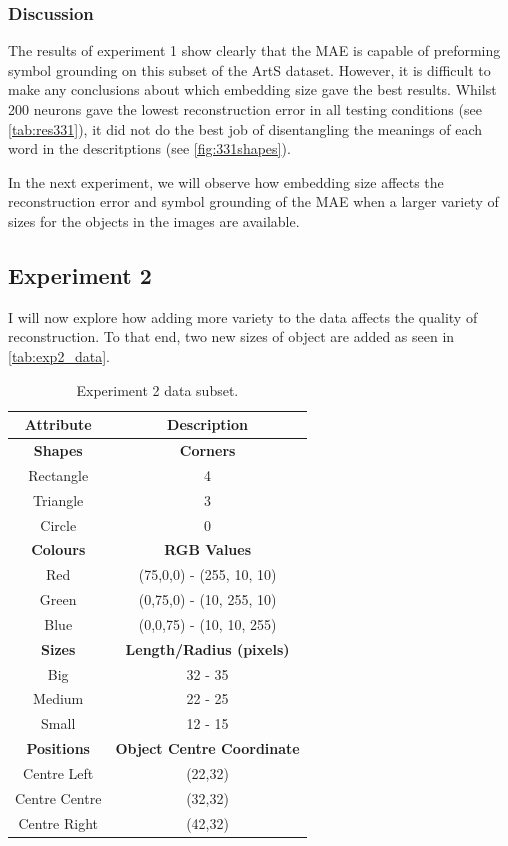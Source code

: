 \subsubsection{Discussion}
The results of experiment 1 show clearly that the MAE is capable of preforming symbol grounding on this subset of the ArtS dataset. However, it is difficult to make any conclusions about which embedding size gave the best results. Whilst 200 neurons gave the lowest reconstruction error in all testing conditions (see \autoref{tab:res331}), it did not do the best job of disentangling the meanings of each word in the descritptions (see \autoref{fig:331shapes}). 

In the next experiment, we will observe how embedding size affects the reconstruction error and symbol grounding of the MAE when a larger variety of sizes for the objects in the images are available.



\subsection{Experiment 2}
I will now explore how adding more variety to the data affects the quality of reconstruction. To that end, two new sizes of object are added as seen in \autoref{tab:exp2_data}. 

\begin{table}[h]
\centering
\begin{tabular}{|c|c|}
\hline
\textbf{Attribute} & \textbf{Description} \\ \hline \hline
\textbf{Shapes} & \textbf{Corners} \\ \hline
Rectangle & 4\\ \hline
Triangle & 3\\ \hline
Circle & 0\\ \hline 

\textbf{Colours} & \textbf{RGB Values}	\\ \hline	
Red & (75,0,0) - (255, 10, 10)\\ \hline
Green  & (0,75,0) - (10, 255, 10)\\ \hline
Blue   & (0,0,75) - (10, 10, 255)\\ \hline


\textbf{Sizes} & 	\textbf{Length/Radius (pixels)} \\ \hline			  
Big    & 32 - 35  \\ \hline
Medium & 22 - 25 \\ \hline
Small  & 12 - 15 \\ \hline 

\textbf{Positions} & \textbf{Object Centre Coordinate}	\\ \hline					  
Centre Left &(22,32)\\ \hline
Centre Centre & (32,32)\\ \hline
Centre Right &(42,32)\\ \hline				
\end{tabular}
\caption{Experiment 2 data subset.}
\label{tab:exp2_data} 
\end{table}



